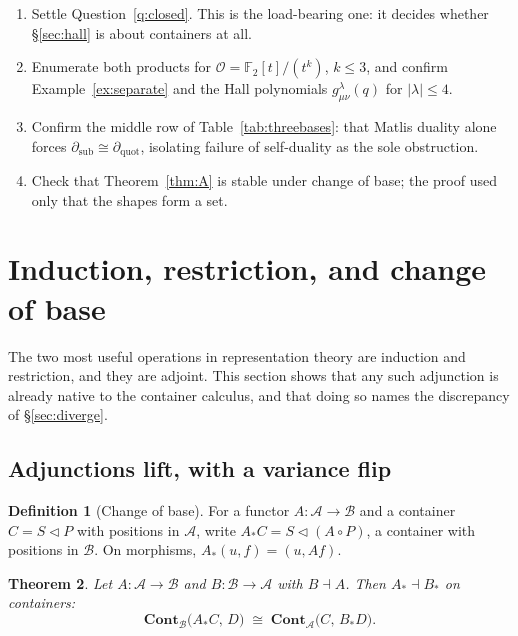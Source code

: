 \documentclass[11pt,a4paper]{article}
\newtheorem{theorem}{Theorem}[section]
\theoremstyle{definition}
\newtheorem{definition}[theorem]{Definition}
\theoremstyle{remark}
\newcommand{\FF}{\mathbb{F}}
\newcommand{\cat}[1]{\mathbf{#1}}
\newcommand{\Cont}{\cat{Cont}}
\newcommand{\con}{\triangleleft}
\begin{document}
\begin{enumerate}[nosep]
  \item Settle Question~\ref{q:closed}. This is the load-bearing one: it decides
        whether \S\ref{sec:hall} is about containers at all.
  \item Enumerate both products for $\mathcal{O} = \FF_2[t]/(t^{k})$, $k \le 3$,
        and confirm Example~\ref{ex:separate} and the Hall polynomials
        $g^{\lambda}_{\mu\nu}(q)$ for $\lvert\lambda\rvert \le 4$.
  \item Confirm the middle row of Table~\ref{tab:threebases}: that Matlis duality
        alone forces $\partial_{\mathrm{sub}} \cong \partial_{\mathrm{quot}}$,
        isolating failure of self-duality as the sole obstruction.
  \item Check that Theorem~\ref{thm:A} is stable under change of base; the proof
        used only that the shapes form a set.
\end{enumerate}


\section{Induction, restriction, and change of base}\label{sec:indres}

The two most useful operations in representation theory are induction and
restriction, and they are adjoint. This section shows that any such adjunction is
already native to the container calculus, and that doing so names the discrepancy
of \S\ref{sec:diverge}.

\subsection{Adjunctions lift, with a variance flip}

\begin{definition}[Change of base]
For a functor $A : \mathcal{A} \to \mathcal{B}$ and a container $C = S \con P$ with
positions in $\mathcal{A}$, write $A_{*}C = S \con (A \circ P)$, a container with
positions in $\mathcal{B}$. On morphisms, $A_{*}(u, f) = (u, A f)$.
\end{definition}

\begin{theorem}\label{thm:lift}
Let $A : \mathcal{A} \to \mathcal{B}$ and $B : \mathcal{B} \to \mathcal{A}$ with
$B \dashv A$. Then $A_{*} \dashv B_{*}$ on containers:
\[
  \Cont_{\mathcal{B}}\bigl(A_{*}C,\, D\bigr)
  \;\cong\;
  \Cont_{\mathcal{A}}\bigl(C,\, B_{*}D\bigr).
\]
\end{theorem}
\end{document}

